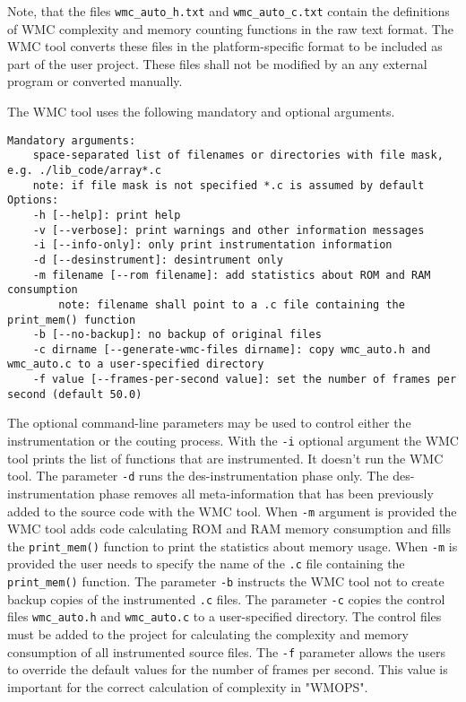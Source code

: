 Note, that the files \verb|wmc_auto_h.txt| and \verb|wmc_auto_c.txt| contain the definitions of WMC complexity and memory counting functions in the raw text format. The WMC tool converts these files in the platform-specific format to be included as part of the user project. These files shall not be modified by an any external program or converted manually.

The WMC tool uses the following mandatory and optional arguments.

\begin{Verbatim}[fontsize=\scriptsize]
Mandatory arguments:
    space-separated list of filenames or directories with file mask, e.g. ./lib_code/array*.c
    note: if file mask is not specified *.c is assumed by default
Options:
    -h [--help]: print help
    -v [--verbose]: print warnings and other information messages
    -i [--info-only]: only print instrumentation information
    -d [--desinstrument]: desintrument only
    -m filename [--rom filename]: add statistics about ROM and RAM consumption
        note: filename shall point to a .c file containing the print_mem() function
    -b [--no-backup]: no backup of original files
    -c dirname [--generate-wmc-files dirname]: copy wmc_auto.h and wmc_auto.c to a user-specified directory
    -f value [--frames-per-second value]: set the number of frames per second (default 50.0)
\end{Verbatim}

The optional command-line parameters may be used to control either the instrumentation or the couting process. With the \verb|-i| optional argument the WMC tool prints the list of functions that are instrumented. It doesn't run the WMC tool. The parameter \verb|-d| runs the des-instrumentation phase only. The des-instrumentation phase removes all meta-information that has been previously added to the source code with the WMC tool. When \verb|-m| argument is provided the WMC tool adds code calculating ROM and RAM memory consumption and fills the \verb|print_mem()| function to print the statistics about memory usage. When \verb|-m| is provided the user needs to specify the name of the \verb|.c| file containing the \verb|print_mem()| function. The parameter \verb|-b| instructs the WMC tool not to create backup copies of the instrumented \verb|.c| files. The parameter \verb|-c| copies the control files \verb|wmc_auto.h| and \verb|wmc_auto.c| to a user-specified directory. The control files must be added to the project for calculating the complexity and memory consumption of all instrumented source files. The \verb|-f| parameter allows the users to override the default values for the number of frames per second. This value is important for the correct calculation of complexity in "WMOPS".


